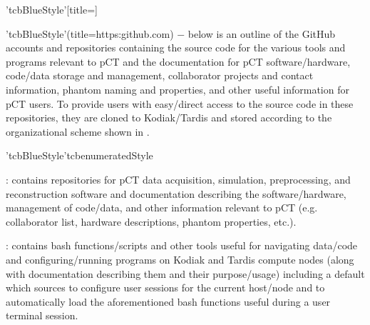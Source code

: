 \begin{tcbenvironment}'tcbBlueStyle'[title=]
\begin{tcbparagraph}'tcbBlueStyle'(title=https:\dirsep\dirsep github.com\dirsep{}\dirsep{})
$\boldsymbol{-}$ below is an outline of the GitHub accounts and repositories containing the source code for the various tools and programs relevant to pCT and the documentation for pCT software/hardware, code/data storage and management, collaborator projects and contact information, phantom naming and properties, and other useful information for pCT users.  To provide users with easy/direct access to the source code in these repositories, they are cloned to Kodiak/Tardis and stored according to the organizational scheme shown in .
\end{tcbparagraph}
\begin{tcbparagraph}'tcbBlueStyle'{tcbenumeratedStyle}
\begin{ThinEnum}[parsep=1mm]
	\item {} : contains repositories for pCT data acquisition, simulation, preprocessing, and reconstruction software and documentation describing the software/hardware, management of code/data, and other information relevant to pCT (e.g. collaborator list, hardware descriptions, phantom properties, etc.).
	\begin{ThinEnum}[parsep=1mm]
		\item {} : contains bash functions/scripts and other tools useful for navigating data/code and configuring/running programs on Kodiak and Tardis compute nodes (along with documentation describing them and their purpose/usage) including a default  which sources  to configure user sessions for the current host/node and  to automatically load the aforementioned bash functions useful during a user terminal session.

\end{ThinEnum}
\end{ThinEnum}
\end{tcbparagraph}
\end{tcbenvironment}

